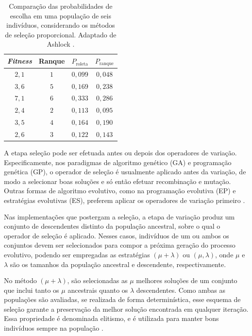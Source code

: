 \documentclass[
	12pt,				%
	openright,			%
	twoside,			%
	a4paper,			%
	tcc,			%
	]{ABNT-DC-UEL}
\begin{document}
\begin{table}[htb]
    \centering
    \begin{tabular}{cccc}
         \hline
         \textbf{\textit{Fitness}} & \textbf{Ranque} & $P_\text{roleta}$ & $P_\text{ranque}$ \\
         \hline
         $2,1$ & $1$ & $0,099$ & $0,048$ \\
         $3,6$ & $5$ & $0,169$ & $0,238$ \\
         $7,1$ & $6$ & $0,333$ & $0,286$ \\
         $2,4$ & $2$ & $0,113$ & $0,095$ \\
         $3,5$ & $4$ & $0,164$ & $0,190$ \\
         $2,6$ & $3$ & $0,122$ & $0,143$ \\
         \hline
    \end{tabular}
    \caption{Comparação das probabilidades de escolha em uma população de seis indivíduos, considerando os métodos de seleção proporcional. Adaptado de Ashlock \cite{ashlock:06}.}
    \label{tab:selecoes}
\end{table}

A etapa seleção pode ser efetuada antes ou depois dos operadores de variação. Especificamente, nos paradigmas de algoritmo genético (GA) e programação genética (GP), o operador de seleção é usualmente aplicado antes da variação, de modo a selecionar boas soluções e só então efetuar recombinação e mutação. Outras formas de algoritmo evolutivo, como na programação evolutiva (EP) e estratégias evolutivas (ES), preferem aplicar os operadores de variação primeiro \cite{back:00}.

Nas implementações que postergam a seleção, a etapa de variação produz um conjunto de descendentes distinto da população ancestral, sobre o qual o operador de seleção é aplicado. Nesses casos, indivíduos de um ou ambos os conjuntos devem ser selecionados para compor a próxima geração do processo evolutivo, podendo ser empregadas as estratégias $(\mu + \lambda)$ ou $(\mu, \lambda)$, onde $\mu$ e $\lambda$ são os tamanhos da população ancestral e descendente, respectivamente.

No método $(\mu + \lambda)$, são selecionadas as $\mu$ melhores soluções de um conjunto que inclui tanto os $\mu$ ancestrais quanto os $\lambda$ descendentes. Como ambas as populações são avaliadas, se realizada de forma determinística, esse esquema de seleção garante a preservação da melhor solução encontrada em qualquer iteração. Essa propriedade é denominada elitismo, e é utilizada para manter bons indivíduos sempre na população \cite{back:00}.
\end{document}
